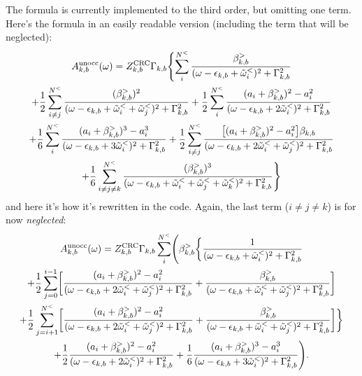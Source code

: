 \documentclass[a4paper,12pt]{article}
\begin{document}
The formula is currently implemented to the third order, but omitting one term. 
Here's the formula in an easily readable version (including the term that will be neglected):
\begin{multline}
 A_{k,b}^\textnormal{unocc}(\omega) = Z_{k,b}^\textnormal{CRC} \Gamma_{k,b} \Biggl\{ 
  \sum_i^{N^<} \frac{\beta_{k,b}^>}{(\omega - \epsilon_{k,b} + \tilde\omega_i^<)^2 + \Gamma_{k,b}^2} \\
 + \frac12 \sum_{i\neq j}^{N^<} 
\frac{(\beta_{k,b}^>)^2}{(\omega - \epsilon_{k,b} + \tilde\omega_i^< + \tilde\omega_j^<)^2 + \Gamma_{k,b}^2}
 + \frac12 \sum_i^{N^<} \frac{(a_i + \beta_{k,b}^>)^2 - a_i^2}{(\omega - \epsilon_{k,b} + 2 \tilde\omega_i^<)^2 + \Gamma_{k,b}^2} \\
 + \frac16 \sum_i^{N^<} \frac{(a_i + \beta_{k,b}^>)^3 - a_i^3}{(\omega - \epsilon_{k,b} + 3 \tilde\omega_i^<)^2 + \Gamma_{k,b}^2} 
 + \frac12 \sum_{i\neq j}^{N^<} \frac{\bigl[(a_i + \beta_{k,b}^>)^2 - a_i^2\bigr] \beta_{k,b} }
  {(\omega - \epsilon_{k,b} + 2\tilde\omega_i^< + \tilde\omega_j^<)^2 + \Gamma_{k,b}^2} \\
 + \frac16 \sum_{i\neq j\neq k}^{N^<} 
\frac{(\beta_{k,b}^>)^3}{(\omega - \epsilon_{k,b} + \tilde\omega_i^< + \tilde\omega_j^< + \tilde\omega_k^<)^2 + \Gamma_{k,b}^2}
\Biggr\}
\end{multline}
and here it's how it's rewritten in the code. Again, the last term ($i\neq j\neq k$) is for now \emph{neglected}: 
\begin{multline}
 A_{k,b}^\textnormal{unocc}(\omega) = Z_{k,b}^\textnormal{CRC} \Gamma_{k,b}  \sum_i^{N^<} \Biggl( \beta_{k,b}^> \biggl\{
 \frac1{(\omega - \epsilon_{k,b} + \tilde\omega_i^<)^2 + \Gamma_{k,b}^2}  \\ 
  + \frac12 \sum_{j=0}^{i-1} \biggl[ \frac{(a_i + \beta_{k,b}^>)^2 - a_i^2 }
  {(\omega - \epsilon_{k,b} + 2 \tilde\omega_i^< + \tilde\omega_j^<)^2 + \Gamma_{k,b}^2} 
 + \frac{\beta_{k,b}^>}{(\omega - \epsilon_{k,b} + \tilde\omega_i^< + \tilde\omega_j^<)^2 + \Gamma_{k,b}^2}  \biggr] \\ 
  + \frac12 \sum_{j=i+1}^{N^<} \biggl[ \frac{(a_i + \beta_{k,b}^>)^2 - a_i^2 }
  {(\omega - \epsilon_{k,b} + 2 \tilde\omega_i^< + \tilde\omega_j^<)^2 + \Gamma_{k,b}^2} 
 + \frac{\beta_{k,b}^>}{(\omega - \epsilon_{k,b} + \tilde\omega_i^< + \tilde\omega_j^<)^2 + \Gamma_{k,b}^2}
 \biggr] \biggr\} \\
 + \frac12 \frac{(a_i + \beta_{k,b}^>)^2 - a_i^2}{(\omega - \epsilon_{k,b} + 2 \tilde\omega_i^<)^2 + \Gamma_{k,b}^2} 
 + \frac16 \frac{(a_i + \beta_{k,b}^>)^3 - a_i^3}{(\omega - \epsilon_{k,b} + 3 \tilde\omega_i^<)^2 + \Gamma_{k,b}^2} 
 \Biggl) . 
\end{multline}
\end{document}
